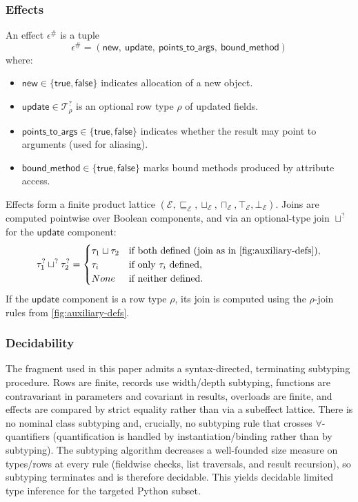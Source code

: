 \subsubsection*{Effects}
\label{sec:effects}
An effect $\epsilon^\#$ is a tuple
\[
\epsilon^\# = (\mathsf{new},\ \mathsf{update},\ \mathsf{points\_to\_args},\ \mathsf{bound\_method})
\]
where:
\begin{itemize}
  \item $\mathsf{new} \in \{\mathsf{true},\mathsf{false}\}$ indicates allocation of a new object.
  \item $\mathsf{update} \in \mathcal{T}^?_{\rho}$ is an optional row type $\rho$ of updated fields.
  \item $\mathsf{points\_to\_args} \in \{\mathsf{true},\mathsf{false}\}$ indicates whether the result may point to arguments (used for aliasing).
  \item $\mathsf{bound\_method} \in \{\mathsf{true},\mathsf{false}\}$ marks bound methods produced by attribute access.
\end{itemize}

Effects form a finite product lattice $(\mathcal{E}, \sqsubseteq_{\mathcal{E}}, \sqcup_{\mathcal{E}}, \sqcap_{\mathcal{E}}, \top_{\mathcal{E}}, \bot_{\mathcal{E}})$.  
Joins are computed pointwise over Boolean components, and via an optional-type join $\sqcup^?$ for the $\mathsf{update}$ component:
\[
\tau_1^? \sqcup^? \tau_2^? =
\begin{cases}
\tau_1 \sqcup \tau_2 & \text{if both defined (join as in \autoref{fig:auxiliary-defs})},\\
\tau_i & \text{if only $\tau_i$ defined},\\
None & \text{if neither defined}.
\end{cases}
\]
If the $\mathsf{update}$ component is a row type $\rho$, its join is computed using the $\rho$-join rules from \autoref{fig:auxiliary-defs}.

\subsubsection*{Decidability}
The fragment used in this paper admits a syntax-directed, terminating subtyping procedure. Rows are finite, records use width/depth subtyping, functions are contravariant in parameters and covariant in results, overloads are finite, and effects are compared by strict equality rather than via a subeffect lattice. There is no nominal class subtyping and, crucially, no subtyping rule that crosses $\forall$-quantifiers (quantification is handled by instantiation/binding rather than by subtyping). The subtyping algorithm decreases a well-founded size measure on types/rows at every rule (fieldwise checks, list traversals, and result recursion), so subtyping terminates and is therefore decidable. This yields decidable limited type inference for the targeted Python subset. 

